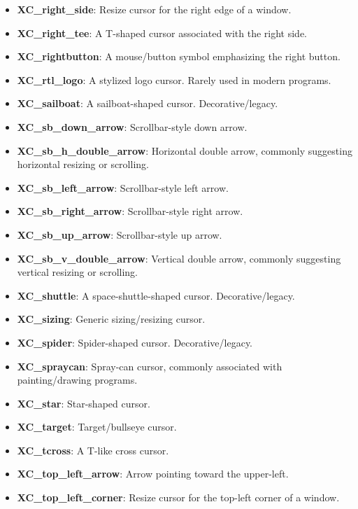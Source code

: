 \documentclass{report}
\begin{document}
\begin{itemize}
\begin{itemize}
                    \item \textbf{XC\_right\_side}:	Resize cursor for the right edge of a window.
                    \item \textbf{XC\_right\_tee}:	A T-shaped cursor associated with the right side.
                    \item \textbf{XC\_rightbutton}:	A mouse/button symbol emphasizing the right button.
                    \item \textbf{XC\_rtl\_logo}:	A stylized logo cursor. Rarely used in modern programs.
                    \item \textbf{XC\_sailboat}:	A sailboat-shaped cursor. Decorative/legacy.
                    \item \textbf{XC\_sb\_down\_arrow}:	Scrollbar-style down arrow.
                    \item \textbf{XC\_sb\_h\_double\_arrow}:	Horizontal double arrow, commonly suggesting horizontal resizing or scrolling.
                    \item \textbf{XC\_sb\_left\_arrow}:	Scrollbar-style left arrow.
                    \item \textbf{XC\_sb\_right\_arrow}:	Scrollbar-style right arrow.
                    \item \textbf{XC\_sb\_up\_arrow}:	Scrollbar-style up arrow.
                    \item \textbf{XC\_sb\_v\_double\_arrow}:	Vertical double arrow, commonly suggesting vertical resizing or scrolling.
                    \item \textbf{XC\_shuttle}:	A space-shuttle-shaped cursor. Decorative/legacy.
                    \item \textbf{XC\_sizing}:	Generic sizing/resizing cursor.
                    \item \textbf{XC\_spider}:	Spider-shaped cursor. Decorative/legacy.
                    \item \textbf{XC\_spraycan}:	Spray-can cursor, commonly associated with painting/drawing programs.
                    \item \textbf{XC\_star}:	Star-shaped cursor.
                    \item \textbf{XC\_target}:	Target/bullseye cursor.
                    \item \textbf{XC\_tcross}:	A T-like cross cursor.
                    \item \textbf{XC\_top\_left\_arrow}:	Arrow pointing toward the upper-left.
                    \item \textbf{XC\_top\_left\_corner}:	Resize cursor for the top-left corner of a window.

\end{itemize}
\end{itemize}
\end{document}
